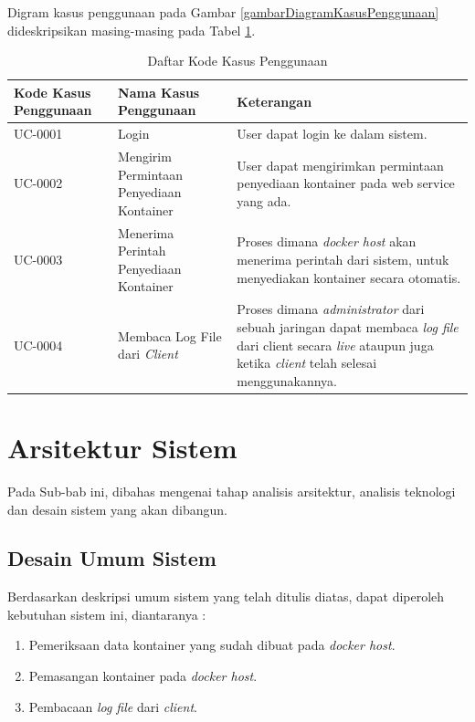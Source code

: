 	Digram kasus penggunaan pada Gambar \ref{gambarDiagramKasusPenggunaan} dideskripsikan masing-masing pada Tabel \ref{tabelKodeKasusPenggunaan}.
    \begin{longtable}{|p{}|p{}|p{}|} %

\caption{Daftar Kode Kasus Penggunaan} \label{tabelKodeKasusPenggunaan} \\
\hline
\textbf{Kode Kasus Penggunaan} & \textbf{Nama Kasus Penggunaan} & \textbf{Keterangan} \\ \hline

\endhead
\endfoot
\endlastfoot

UC-0001 & Login & User dapat login ke dalam sistem. \\ \hline
UC-0002 & Mengirim Permintaan Penyediaan Kontainer & User dapat mengirimkan permintaan penyediaan kontainer pada web service yang ada. \\ \hline
UC-0003 & Menerima Perintah Penyediaan Kontainer  &  Proses dimana \textit{docker host} akan menerima perintah dari sistem, untuk menyediakan kontainer secara otomatis.\\ \hline
UC-0004 & Membaca Log File dari \textit{Client}  &  Proses dimana \textit{administrator} dari sebuah jaringan dapat membaca \textit{log file} dari client secara \textit{live} ataupun juga ketika \textit{client} telah selesai menggunakannya.\\ \hline
\end{longtable}

  \section{Arsitektur Sistem}
  	Pada Sub-bab ini, dibahas mengenai tahap analisis arsitektur, analisis teknologi dan desain sistem yang akan dibangun.
    \subsection{Desain Umum Sistem}
      \indent Berdasarkan deskripsi umum sistem yang telah ditulis diatas, dapat diperoleh kebutuhan sistem ini, diantaranya :
        \begin{enumerate}
        \item Pemeriksaan data kontainer yang sudah dibuat pada \textit{docker host}.
        \item Pemasangan kontainer pada \textit{docker host}.
        \item Pembacaan \textit{log file} dari \textit{client}.
        \end{enumerate} 
      

